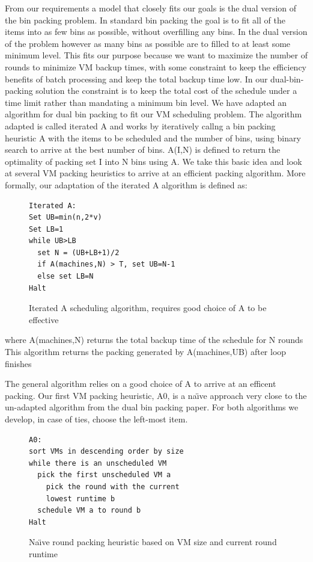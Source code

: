 From our requirements a model that closely fits our goals is the dual version
of the
bin packing problem. In standard bin packing the goal is to fit all of the
items into as few bins as possible, without overfilling any bins. In the dual
version of the problem however as many bins as possible are to filled to at
least some minimum level. This fits our purpose because we want to maximize the
number of rounds to minimize VM backup times, with some constraint to keep the
efficiency benefits of batch processing and keep the total backup time low.
In our dual-bin-packing solution the constraint is to keep the total
cost of the schedule under a time limit rather than mandating a minimum bin
level. We have adapted
an algorithm for dual bin packing\cite{DualBinPacking} to fit our VM
scheduling problem. The algorithm adapted is called iterated A and works by
iteratively callng a bin packing heuristic A with the items to be scheduled and
the number of bins, using binary search to arrive at the best number of
bins. A(I,N) is defined to return the optimality of packing set I into N bins
using A. We take this basic idea and look at several VM packing heuristics to
arrive at an efficient packing algorithm. More formally, our adaptation of the
iterated A algorithm is defined as:


\begin{figure}
\begin{lstlisting}[frame=single]
Iterated A:
Set UB=min(n,2*v)
Set LB=1
while UB>LB
  set N = (UB+LB+1)/2
  if A(machines,N) > T, set UB=N-1
  else set LB=N
Halt
\end{lstlisting}
\caption{Iterated A scheduling algorithm, requires good choice of A to be effective}
\end{figure}

where A(machines,N) returns the total backup time of the schedule for N rounds\\
This algorithm returns the packing generated by A(machines,UB) after loop finishes

The general algorithm relies on a good choice of A to arrive at an efficent
packing. Our first VM packing heuristic, A0, is a na\"\i{}ve approach very
close to the un-adapted algorithm from the dual bin packing paper. For both
algorithms we develop, in case of ties, choose the left-most item.

\begin{figure}
\begin{lstlisting}[frame=single]
A0:
sort VMs in descending order by size
while there is an unscheduled VM
  pick the first unscheduled VM a
    pick the round with the current
    lowest runtime b
  schedule VM a to round b
Halt
\end{lstlisting}
\caption{Na\"{\i}ve round packing heuristic based on VM size and current round runtime}
\end{figure}

